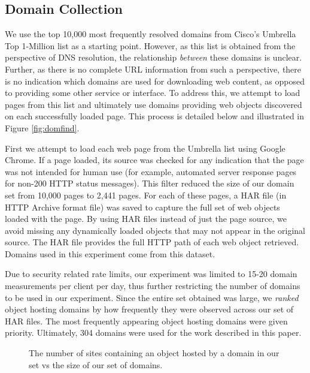 \subsection{Domain Collection}

We use the top 10,000 most frequently resolved domains from Cisco's Umbrella Top
1-Million list \cite{scheitle2018} as a starting point. 
However, as this list is obtained from
the perspective of DNS resolution, the relationship \emph{between} these domains
is unclear. Further, as there is no complete URL information from such a
perspective, there is no indication which domains are used for downloading web
content, as opposed to providing some other service or interface. To address
this, we attempt to load pages from this list and ultimately use domains
providing web objects discovered on each successfully loaded page. This process
is detailed below and illustrated in Figure \ref{fig:domfind}.

First we attempt to load each web page from the Umbrella list using Google
Chrome. If a page loaded, its source was checked for any indication that the
page was not intended for human use (for example, automated server response
pages for non-200 HTTP status messages). This filter reduced the size of our
domain set from 10,000 pages to 2,441 pages. For each of these pages, a HAR file
(in HTTP Archive format file) was saved to capture the full set of web objects
loaded with the page. By using HAR files instead of just the page source, we
avoid missing any dynamically loaded objects that may not appear in the original
source. 
The HAR file provides the
full HTTP path of each web object retrieved. Domains used in this experiment
come from this dataset. 

Due to security related rate limits, our experiment was limited to 15-20 domain measurements per
client per day, thus further restricting the number of domains to be used in our
experiment. Since the entire set obtained was large, we \emph{ranked}
object hosting domains by how frequently they were observed across our set of HAR
files. The most frequently appearing object hosting domains were given priority.
Ultimately, 304 domains were used for the work described in this paper. 


\begin{figure}
    \caption{The number of sites containing an object hosted by a domain in our set vs
    the size of our set of domains.}
    \label{fig:sitescovered}
\end{figure}

